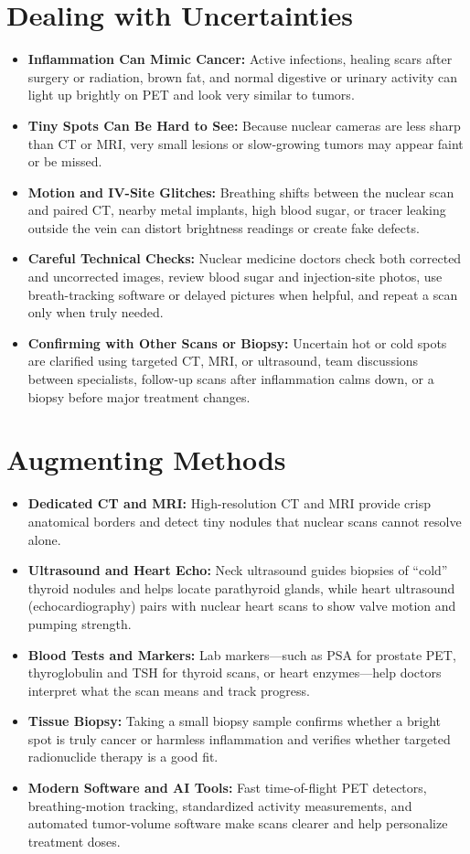 \section{Dealing with Uncertainties}
\begin{itemize}
  \item \textbf{Inflammation Can Mimic Cancer:} Active infections, healing scars after surgery or radiation, brown fat, and normal digestive or urinary activity can light up brightly on PET and look very similar to tumors.
  \item \textbf{Tiny Spots Can Be Hard to See:} Because nuclear cameras are less sharp than CT or MRI, very small lesions or slow-growing tumors may appear faint or be missed.
  \item \textbf{Motion and IV-Site Glitches:} Breathing shifts between the nuclear scan and paired CT, nearby metal implants, high blood sugar, or tracer leaking outside the vein can distort brightness readings or create fake defects.
  \item \textbf{Careful Technical Checks:} Nuclear medicine doctors check both corrected and uncorrected images, review blood sugar and injection-site photos, use breath-tracking software or delayed pictures when helpful, and repeat a scan only when truly needed.
  \item \textbf{Confirming with Other Scans or Biopsy:} Uncertain hot or cold spots are clarified using targeted CT, MRI, or ultrasound, team discussions between specialists, follow-up scans after inflammation calms down, or a biopsy before major treatment changes.
\end{itemize}

\section{Augmenting Methods}
\begin{itemize}
  \item \textbf{Dedicated CT and MRI:} High-resolution CT and MRI provide crisp anatomical borders and detect tiny nodules that nuclear scans cannot resolve alone.
  \item \textbf{Ultrasound and Heart Echo:} Neck ultrasound guides biopsies of ``cold'' thyroid nodules and helps locate parathyroid glands, while heart ultrasound (echocardiography) pairs with nuclear heart scans to show valve motion and pumping strength.
  \item \textbf{Blood Tests and Markers:} Lab markers---such as PSA for prostate PET, thyroglobulin and TSH for thyroid scans, or heart enzymes---help doctors interpret what the scan means and track progress.
  \item \textbf{Tissue Biopsy:} Taking a small biopsy sample confirms whether a bright spot is truly cancer or harmless inflammation and verifies whether targeted radionuclide therapy is a good fit.
  \item \textbf{Modern Software and AI Tools:} Fast time-of-flight PET detectors, breathing-motion tracking, standardized activity measurements, and automated tumor-volume software make scans clearer and help personalize treatment doses.
\end{itemize}

